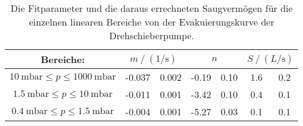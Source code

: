     \begin{table}[h]
      \centering
      \caption{Die Fitparameter und die daraus errechneten Saugvermögen für die einzelnen linearen Bereiche von der Evakuierungskurve der Drehschieberpumpe.}
      \label{tab:fitpara_dreh_alt}
      \begin{tabular}{c S[table-format=2.3] @{${}\pm{}$} S[table-format=1.3]  S[table-format=2.2] @{${}\pm{}$} S[table-format=1.2] S @{${}\pm{}$} S}
        \toprule
        {Bereiche:} &  &  & \\
        \midrule
        $\SI{10}{\milli\bar} \leq p \leq \SI{1000}{\milli\bar}$ & -0.037 & 0.002 & -0.19 & 0.10 & 1.6 & 0.2 \\
        $\SI{1.5}{\milli\bar} \leq p \leq \SI{10}{\milli\bar}$  & -0.011 & 0.001 & -3.42 & 0.10 & 0.4 & 0.1 \\
        $\SI{0.4}{\milli\bar} \leq p \leq \SI{1.5}{\milli\bar}$ & -0.004 & 0.001 & -5.27 & 0.03 & 0.1 & 0.1 \\
        \bottomrule
      \end{tabular}
    \end{table}